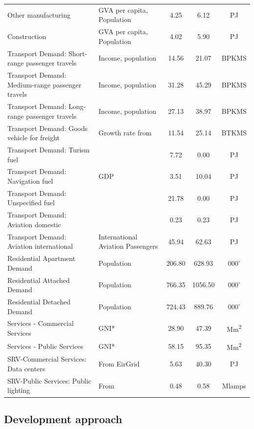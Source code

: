 \documentclass[gmd,manuscript]{copernicus}
\begin{document}
\begin{table}[htbp]
\begin{tabular}{llccc}
    Other manufacturing  & GVA per capita, Population & 4.25  & 6.12  & PJ \\
    Construction & GVA per capita, Population & 4.02  & 5.90  & PJ \\
    Transport Demand: Short-range passenger travels & Income, population & 14.56 & 21.07 & BPKMS \\
    Transport Demand: Medium-range passenger travels & Income, population & 31.28 & 45.29 & BPKMS \\
    Transport Demand: Long-range passenger travels & Income, population & 27.13 & 38.97 & BPKMS \\
    Transport Demand: Goods vehicle for freight & Growth rate from \citep{AECOMIrelandLimited2019} & 11.54 & 25.14 & BTKMS \\
    Transport Demand: Turism fuel  &       & 7.72  & 0.00  & PJ \\
    Transport Demand: Navigation fuel  & GDP   & 3.51  & 10.04 & PJ \\
    Transport Demand: Unspecified fuel &       & 21.78 & 0.00  & PJ \\
    Transport Demand: Aviation domestic &       & 0.23  & 0.23  & PJ \\
    Transport Demand: Aviation international & International Aviation Passengers & 45.94 & 62.63 & PJ \\
    Residential Apartment Demand & Population & 206.80 & 628.93 & 000' \\
    Residential Attached Demand & Population & 766.35 & 1056.50 & 000' \\
    Residential Detached Demand & Population & 724.43 & 889.76 & 000' \\
    Services - Commercial Services & GNI*  & 28.90 & 47.39 & Mm\textsuperscript{2} \\
    Services - Public Services & GNI*  & 58.15 & 95.35 & Mm\textsuperscript{2} \\
    SRV-Commercial Services: Data centers & From EirGrid & 5.63  & 40.30 & PJ \\
    SRV-Public Services: Public lighting & From \citep{GovernmentofIreland2018} & 0.48  & 0.58  & Mlamps \\ \hline
    \end{tabular}%
  \label{tab:ESD_list}%
\end{table}%


\subsection{Development approach}
\label{ss:model_dev}
\end{document}

